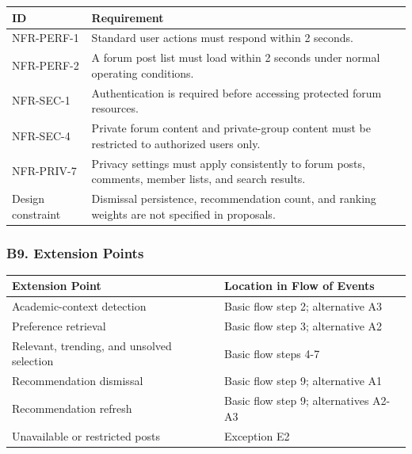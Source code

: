 \documentclass[12pt]{article}
\renewcommand{\baselinestretch}{1.5}
\begin{document}
\begingroup
\small
\renewcommand{\baselinestretch}{1.0}\selectfont
\renewcommand{\arraystretch}{1.15}
\setlength{\tabcolsep}{6pt}
\begin{longtable}{|>{\raggedright\arraybackslash}p{}|>{\raggedright\arraybackslash}p{}|}
\hline
\textbf{ID} & \textbf{Requirement} \\ \hline
\endhead
NFR-PERF-1 & Standard user actions must respond within 2 seconds. \\ \hline
NFR-PERF-2 & A forum post list must load within 2 seconds under normal operating conditions. \\ \hline
NFR-SEC-1 & Authentication is required before accessing protected forum resources. \\ \hline
NFR-SEC-4 & Private forum content and private-group content must be restricted to authorized users only. \\ \hline
NFR-PRIV-7 & Privacy settings must apply consistently to forum posts, comments, member lists, and search results. \\ \hline
Design constraint & Dismissal persistence, recommendation count, and ranking weights are not specified in proposals. \\ \hline
\end{longtable}
\endgroup
\par\medskip

\hypertarget{sec:b9-extension-points}{}
\subsubsection*{B9. Extension Points}
\par\medskip

\begingroup
\small
\renewcommand{\baselinestretch}{1.0}\selectfont
\renewcommand{\arraystretch}{1.15}
\setlength{\tabcolsep}{6pt}
\begin{longtable}{|>{\raggedright\arraybackslash}p{}|>{\raggedright\arraybackslash}p{}|}
\hline
\textbf{Extension Point} & \textbf{Location in Flow of Events} \\ \hline
\endhead
Academic-context detection & Basic flow step 2; alternative A3 \\ \hline
Preference retrieval & Basic flow step 3; alternative A2 \\ \hline
Relevant, trending, and unsolved selection & Basic flow steps 4-7 \\ \hline
Recommendation dismissal & Basic flow step 9; alternative A1 \\ \hline
Recommendation refresh & Basic flow step 9; alternatives A2-A3 \\ \hline
Unavailable or restricted posts & Exception E2 \\ \hline
\end{longtable}
\endgroup
\par\medskip
\end{document}
